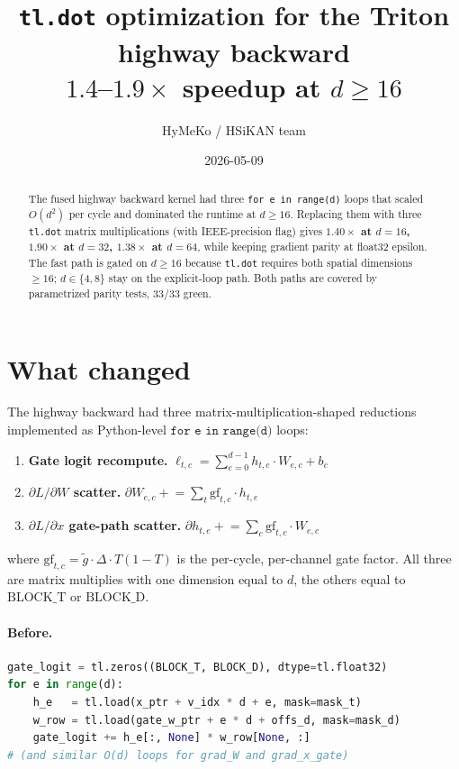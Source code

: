 \documentclass[11pt,a4paper]{article}
\title{\bfseries \texttt{tl.dot} optimization for the Triton highway backward \\
       \large $1.4$--$1.9\times$ speedup at $d \ge 16$}
\author{HyMeKo / HSiKAN team}
\date{2026-05-09}
\begin{document}
\maketitle

\begin{abstract}
\noindent The fused highway backward kernel had three
\texttt{for e in range(d)} loops that scaled $O(d^2)$ per cycle and
dominated the runtime at $d \ge 16$. Replacing them with three
\texttt{tl.dot} matrix multiplications (with IEEE-precision flag)
gives \textbf{$1.40\times$ at $d=16$, $1.90\times$ at $d=32$,
$1.38\times$ at $d=64$}, while keeping gradient parity at float32
epsilon. The fast path is gated on $d \ge 16$ because
\texttt{tl.dot} requires both spatial dimensions $\ge 16$;
$d \in \{4, 8\}$ stay on the explicit-loop path. Both paths are
covered by parametrized parity tests, $33/33$ green.
\end{abstract}

\section{What changed}

The highway backward had three matrix-multiplication-shaped reductions
implemented as Python-level $\texttt{for e in range(d)}$ loops:

\begin{enumerate}[leftmargin=*]
  \item \textbf{Gate logit recompute.}
        $\ell_{t, c} = \sum_{e=0}^{d-1} h_{t, e} \cdot W_{e, c} + b_c$
  \item \textbf{$\partial L / \partial W$ scatter.}
        $\partial W_{e, c} \mathrel{+}= \sum_{t} \mathrm{gf}_{t, c} \cdot h_{t, e}$
  \item \textbf{$\partial L / \partial x$ gate-path scatter.}
        $\partial h_{t, e} \mathrel{+}= \sum_{c} \mathrm{gf}_{t, c} \cdot W_{e, c}$
\end{enumerate}

where $\mathrm{gf}_{t, c} = \tilde g \cdot \Delta \cdot T(1{-}T)$ is the
per-cycle, per-channel gate factor. All three are matrix multiplies
with one dimension equal to $d$, the others equal to $\mathrm{BLOCK\_T}$
or $\mathrm{BLOCK\_D}$.

\paragraph{Before.}
\begin{lstlisting}[language=Python]
gate_logit = tl.zeros((BLOCK_T, BLOCK_D), dtype=tl.float32)
for e in range(d):
    h_e   = tl.load(x_ptr + v_idx * d + e, mask=mask_t)
    w_row = tl.load(gate_w_ptr + e * d + offs_d, mask=mask_d)
    gate_logit += h_e[:, None] * w_row[None, :]
# (and similar O(d) loops for grad_W and grad_x_gate)
\end{lstlisting}
\end{document}
